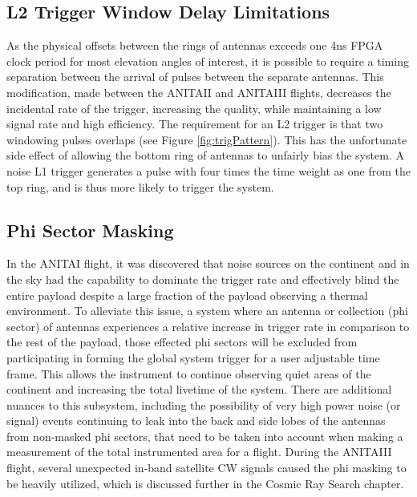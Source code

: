 				
	\subsection{L2 Trigger Window Delay Limitations}
		As the physical offsets between the rings of antennas exceeds one 4ns FPGA clock period for most elevation angles of interest, it is possible to require a timing separation between the arrival of pulses between the separate antennas.  This modification, made between the ANITAII and ANITAIII flights, decreases the incidental rate of the trigger, increasing the quality, while maintaining a low signal rate and high efficiency.  The requirement for an L2 trigger is that two windowing pulses overlaps (see Figure \ref{fig:trigPattern}).  This has the unfortunate side effect of allowing the bottom ring of antennas to unfairly bias the system. A noise L1 trigger generates a pulse with four times the time weight as one from the top ring, and is thus more likely to trigger the system.  
		
	\subsection{Phi Sector Masking}
		In the ANITAI flight, it was discovered that noise sources on the continent and in the sky had the capability to dominate the trigger rate and effectively blind the entire payload despite a large fraction of the payload observing a thermal environment. To alleviate this issue, a system where an antenna or collection (phi sector) of antennas experiences a relative increase in trigger rate in comparison to the rest of the payload, those effected phi sectors will be excluded from participating in forming the global system trigger for a user adjustable time frame.  This allows the instrument to continue observing quiet areas of the continent and increasing the total livetime of the system.  There are additional nuances to this subsystem, including the possibility of very high power noise (or signal) events continuing to leak into the back and side lobes of the antennas from non-masked phi sectors, that need to be taken into account when making a measurement of the total instrumented area for a flight.  During the ANITAIII flight, several unexpected in-band satellite CW signals caused the phi masking to be heavily utilized, which is discussed further in the Cosmic Ray Search chapter.
		
		
